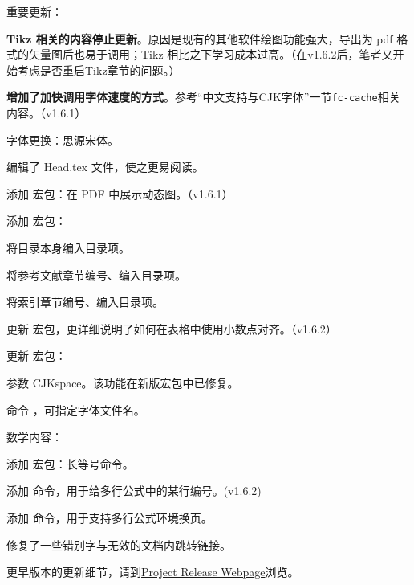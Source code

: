 \begin{feai}
\item 重要更新：
  \begin{feai}
  \item \textbf{Tikz 相关的内容停止更新}。原因是现有的其他软件绘图功能强大，导出为 pdf 格式的矢量图后也易于调用；Tikz 相比之下学习成本过高。（在v1.6.2后，笔者又开始考虑是否重启Tikz章节的问题。）
  \item \textbf{增加了加快\xelatex 调用字体速度的方式}。参考“中文支持与CJK字体”一节\texttt{fc-cache}相关内容。（v1.6.1）
  \end{feai}
\item 字体更换：思源宋体。
\item 编辑了 Head.tex 文件，使之更易阅读。
\item [添加]宏包：在 PDF 中展示动态图。（v1.6.1）
\item [添加]宏包：
  \begin{feai}
  \item 将目录本身编入目录项。
  \item 将参考文献章节编号、编入目录项。
  \item 将索引章节编号、编入目录项。
  \end{feai}
\item [更新]宏包，更详细说明了如何在表格中使用小数点对齐。（v1.6.2）
\item [更新]宏包：
  \begin{feai}
  \item 参数 CJKspace。该功能在新版宏包中已修复。
  \item 命令 ，可指定字体文件名。
  \end{feai}
\item 数学内容：
  \begin{feai}
  \item [添加]宏包：长等号命令。
  \item [添加]命令，用于给多行公式中的某行编号。(v1.6.2)
  \item [添加]命令，用于支持多行公式环境换页。
  \end{feai}
\item 修复了一些错别字与无效的文档内跳转链接。
\end{feai}

\mbox{}

更早版本的更新细节，请到\href{https://github.com/wklchris/Note-by-LaTeX/releases}{Project Release Webpage}浏览。

